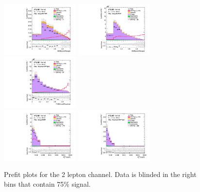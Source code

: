 \begin{figure}[ht]
    \centering
    \includegraphics[width=0.35\textwidth]{figures/2lep/FitResults/Region_distRNNScoreMerged_DSRVBSHP_BMin0_J0_incJet1_L2_T0_incFat1_Y6051_incTag1_Fat1_Prefit.pdf}
    \includegraphics[width=0.35\textwidth]{figures/2lep/FitResults/Region_distRNNScoreMerged_DSRVBSLP_BMin0_J0_incJet1_L2_T0_incFat1_Y6051_incTag1_Fat1_Prefit.pdf}
    \includegraphics[width=0.35\textwidth]{figures/2lep/FitResults/Region_distRNNScoreResolved_DSRVBSFid_BMin0_T0_Y6051_incTag1_J2_L2_incJet1_Prefit.pdf}
    \\
    \includegraphics[width=0.35\textwidth]{figures/2lep/FitResults/Region_distMTagMerJets_DCRVjet_BMin0_J0_incJet1_L2_T0_incFat1_Y6051_incTag1_Fat1_Prefit.pdf}
    \includegraphics[width=0.35\textwidth]{figures/2lep/FitResults/Region_distMTagResJets_DCRVjetFid_BMin0_T0_Y6051_incTag1_J2_L2_incJet1_Prefit.pdf}
    \caption{Prefit plots for the 2 lepton channel. Data is blinded in the right bins that contain 75\% signal.}
       \label{fig:fit_2lep_prefit}
\end{figure}
\clearpage


